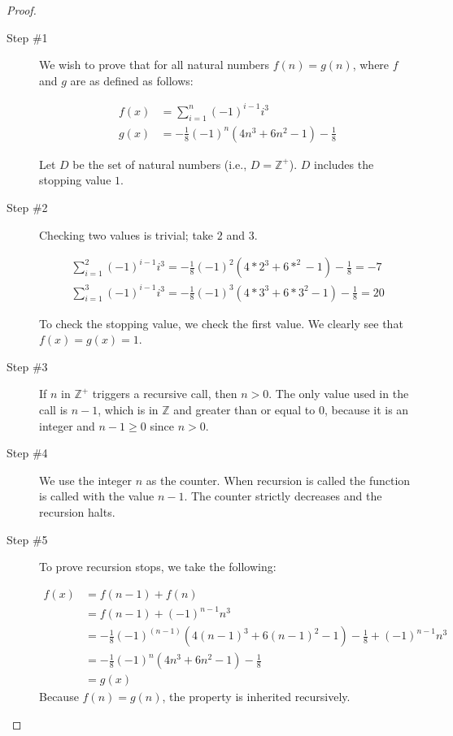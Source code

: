 \documentclass[12pt]{scrartcl}
\begin{document}
\begin{proof}
    \begin{description}
        \item[Step \#1] We wish to prove that for all natural numbers $f(n) = g(n)$, where $f$ and $g$ are as defined as follows:

            \begin{align*}
                f(x) &=  \sum _{i = 1}^n  {(-1)}^{i - 1} i^3 \\
                g(x) &= -\frac{1}{8} {(-1)}^n \left( 4n^3 + 6n^2 - 1 \right) - \frac{1}{8}
            \end{align*}

            Let $D$ be the set of natural numbers (i.e., $D = \mathbb{Z}^+$). $D$ includes the stopping value $1$.

        \item[Step \#2] Checking two values is trivial; take $2$ and $3$.

            \begin{align*}
                \sum _{i = 1}^2 {(-1)}^{i - 1} i^3 = -\frac{1}{8} {(-1)}^2 \left( 4 * 2^3 + 6 * ^2 - 1 \right) - \frac{1}{8} = -7 \\
                \sum _{i = 1}^3 {(-1)}^{i - 1} i^3 = -\frac{1}{8} {(-1)}^3 \left( 4 * 3^3 + 6 * 3^2 - 1 \right) - \frac{1}{8} = 20
            \end{align*}

            To check the stopping value, we check the first value. We clearly see that $f(x) = g(x) = 1$.

        \item[Step \#3] If $n$ in $\mathbb{Z}^+$ triggers a recursive call, then $n > 0$. The only value used in the call is $n - 1$, which is in $\mathbb{Z}$ and greater than or equal to $0$, because it is an integer and $n − 1 \geq 0$ since $n > 0$.

        \item[Step \#4] We use the integer $n$ as the counter. When recursion is called the function is called with the value $n - 1$. The counter strictly decreases and the recursion halts.

        \item[Step \#5] To prove recursion stops, we take the following:

            \begin{align}
                f(x) &= f(n - 1) + f(n) \\
                     &= f(n - 1) + {(-1)}^{n-1} n^3 \\
                     &= -\frac{1}{8} {(-1)}^{(n - 1)} \left( 4{(n - 1)}^3 + 6{(n - 1)}^2 - 1 \right) - \frac{1}{8} + {(-1)}^{n-1} n^3 \\
                     &= -\frac{1}{8} {(-1)}^n \left( 4n^3 + 6n^2 - 1 \right) - \frac{1}{8} \\
                     &= g(x)
            \end{align}
            Because $f(n) = g(n)$, the property is inherited recursively.


\end{description}
\end{proof}
\end{document}
